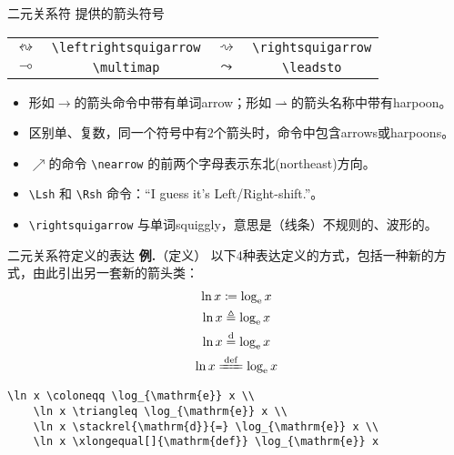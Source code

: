 \documentclass[mathserif]{beamer}
\newcommand{\codegreen}[1]{\textcolor{codegreen}{#1}}
\newenvironment{instance}{\zihao{-5}\textbf{\songti \codegreen{例.}}}{\hfill\par}
\begin{document}
\begin{frame}[fragile]{二元关系符}{\AmS{} 提供的箭头符号}
\begin{table}[H]
\centering
\begin{tabular}{cc|cc}
	\toprule
	$\leftrightsquigarrow$ & \lstinline'\leftrightsquigarrow' & $\rightsquigarrow$ & \lstinline'\rightsquigarrow' \\
	$\multimap$ & \lstinline'\multimap' & $\leadsto$ & \lstinline'\leadsto' \\
	\bottomrule
\end{tabular}
\end{table}
\begin{itemize}

\item 形如$\to$的箭头命令中带有单词arrow；形如$\rightharpoonup$的箭头名称中带有harpoon。

\item 区别单、复数，同一个符号中有2个箭头时，命令中包含arrows或harpoons。

\item $\nearrow$的命令 \lstinline'\nearrow' 的前两个字母表示东北(northeast)方向。

\item  \lstinline'\Lsh' 和 \lstinline'\Rsh' 命令：``I guess it's Left/Right-shift.''。

\item \lstinline'\rightsquigarrow' 与单词squiggly，意思是（线条）不规则的、波形的。
\end{itemize}
\end{frame}

\begin{frame}[fragile]{二元关系符}{定义的表达}
\begin{instance}（定义）
	以下4种表达定义的方式，包括一种新的方式，由此引出另一套新的箭头类：
\begin{equation*}
	\begin{gathered}
		\ln x \coloneqq \log_{\mathrm{e}} x \\
		\ln x \triangleq \log_{\mathrm{e}} x \\
		\ln x \stackrel{\mathrm{d}}{=} \log_{\mathrm{e}} x \\
		\ln x \xlongequal[]{\mathrm{def}} \log_{\mathrm{e}} x
	\end{gathered}
\end{equation*}
\begin{lstlisting}[numbers=none]
	\ln x \coloneqq \log_{\mathrm{e}} x \\
	\ln x \triangleq \log_{\mathrm{e}} x \\
	\ln x \stackrel{\mathrm{d}}{=} \log_{\mathrm{e}} x \\
	\ln x \xlongequal[]{\mathrm{def}} \log_{\mathrm{e}} x
\end{lstlisting}
\end{instance}
\end{frame}
\end{document}
